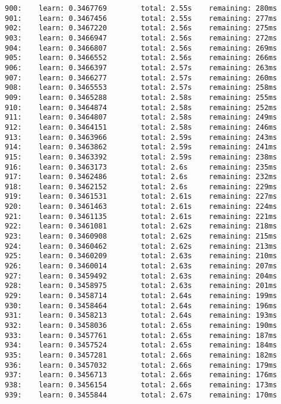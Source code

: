 \documentclass[11pt]{article}
\begin{document}
\begin{Verbatim}[commandchars=\\\{\}]
900:    learn: 0.3467769        total: 2.55s    remaining: 280ms
901:    learn: 0.3467456        total: 2.55s    remaining: 277ms
902:    learn: 0.3467220        total: 2.56s    remaining: 275ms
903:    learn: 0.3466947        total: 2.56s    remaining: 272ms
904:    learn: 0.3466807        total: 2.56s    remaining: 269ms
905:    learn: 0.3466552        total: 2.56s    remaining: 266ms
906:    learn: 0.3466397        total: 2.57s    remaining: 263ms
907:    learn: 0.3466277        total: 2.57s    remaining: 260ms
908:    learn: 0.3465553        total: 2.57s    remaining: 258ms
909:    learn: 0.3465288        total: 2.58s    remaining: 255ms
910:    learn: 0.3464874        total: 2.58s    remaining: 252ms
911:    learn: 0.3464807        total: 2.58s    remaining: 249ms
912:    learn: 0.3464151        total: 2.58s    remaining: 246ms
913:    learn: 0.3463966        total: 2.59s    remaining: 243ms
914:    learn: 0.3463862        total: 2.59s    remaining: 241ms
915:    learn: 0.3463392        total: 2.59s    remaining: 238ms
916:    learn: 0.3463173        total: 2.6s     remaining: 235ms
917:    learn: 0.3462486        total: 2.6s     remaining: 232ms
918:    learn: 0.3462152        total: 2.6s     remaining: 229ms
919:    learn: 0.3461531        total: 2.61s    remaining: 227ms
920:    learn: 0.3461463        total: 2.61s    remaining: 224ms
921:    learn: 0.3461135        total: 2.61s    remaining: 221ms
922:    learn: 0.3461081        total: 2.62s    remaining: 218ms
923:    learn: 0.3460908        total: 2.62s    remaining: 215ms
924:    learn: 0.3460462        total: 2.62s    remaining: 213ms
925:    learn: 0.3460209        total: 2.63s    remaining: 210ms
926:    learn: 0.3460014        total: 2.63s    remaining: 207ms
927:    learn: 0.3459492        total: 2.63s    remaining: 204ms
928:    learn: 0.3458975        total: 2.63s    remaining: 201ms
929:    learn: 0.3458714        total: 2.64s    remaining: 199ms
930:    learn: 0.3458464        total: 2.64s    remaining: 196ms
931:    learn: 0.3458213        total: 2.64s    remaining: 193ms
932:    learn: 0.3458036        total: 2.65s    remaining: 190ms
933:    learn: 0.3457761        total: 2.65s    remaining: 187ms
934:    learn: 0.3457524        total: 2.65s    remaining: 184ms
935:    learn: 0.3457281        total: 2.66s    remaining: 182ms
936:    learn: 0.3457032        total: 2.66s    remaining: 179ms
937:    learn: 0.3456713        total: 2.66s    remaining: 176ms
938:    learn: 0.3456154        total: 2.66s    remaining: 173ms
939:    learn: 0.3455844        total: 2.67s    remaining: 170ms

\end{Verbatim}
\end{document}
